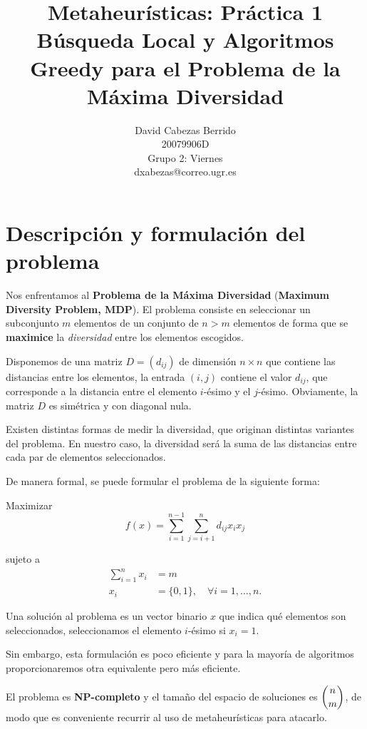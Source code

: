 \documentclass{article}
\title{\Huge Metaheurísticas: Práctica 1 \\ Búsqueda Local y Algoritmos Greedy para el Problema de la Máxima Diversidad \vspace{10mm}}
\author{\huge David Cabezas Berrido \vspace{10mm} \\
	\huge 20079906D \vspace{10mm} \\  
  \huge Grupo 2: Viernes \vspace{10mm} \\ 
  \huge dxabezas@correo.ugr.es \vspace{10mm}}
\begin{document}
\maketitle
\newpage
\tableofcontents
\newpage

\section{Descripción y formulación del problema}

Nos enfrentamos al \textbf{Problema de la Máxima Diversidad} (\textbf{Maximum Diversity Problem, MDP}). El problema consiste en seleccionar
un subconjunto $m$ elementos de un conjunto de $n>m$ elementos de forma que se \textbf{maximice} la \emph{diversidad} entre los
 elementos escogidos.
 
 Disponemos de una matriz $D=(d_{ij})$ de dimensión $n\times n$ que contiene las distancias entre los elementos, la entrada $(i,j)$ contiene el
 valor $d_{ij}$, que corresponde a la distancia entre el elemento $i$-ésimo y el $j$-ésimo. Obviamente, la matriz $D$ es simétrica y con
 diagonal nula.
 
 Existen distintas formas de medir la diversidad, que originan distintas variantes del problema. En nuestro caso, la diversidad será la suma
 de las distancias entre cada par de elementos seleccionados.

De manera formal, se puede formular el problema de la siguiente forma:

\begin{description}
	\item Maximizar 
	\begin{equation} \label{eq:objetivo}
		f(x)=\sum_{i=1}^{n-1}\sum_{j=i+1}^n d_{ij} x_i x_j
	\end{equation}
	\item sujeto a 
	\begin{align*}
		\sum_{i=1}^n x_i &= m \\
		x_i&= \{0,1\}, \quad\forall i=1,\ldots, n.
	\end{align*}
\end{description}

Una solución al problema es un vector binario $x$ que indica qué elementos son seleccionados, seleccionamos el elemento $i$-ésimo si $x_i=1$.

Sin embargo, esta formulación es poco eficiente y para la mayoría de algoritmos proporcionaremos otra equivalente pero más eficiente.

El problema es \textbf{NP-completo} y el tamaño del espacio de soluciones es $\dbinom{n}{m}$, de modo que es conveniente recurrir al uso de metaheurísticas
para atacarlo.
\end{document}
